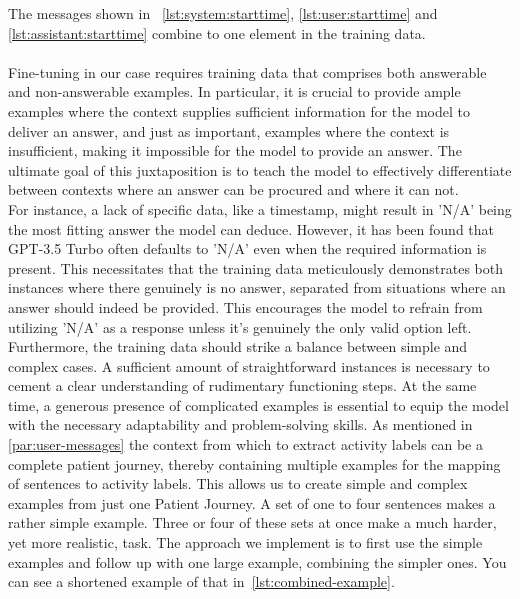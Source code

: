 The messages shown in ~\autoref{lst:system:starttime}, \ref{lst:user:starttime} and \ref{lst:assistant:starttime} combine to one element in the training data.\\\\

Fine-tuning in our case requires training data that comprises both answerable and non-answerable examples. In particular, it is crucial to provide ample examples where the context supplies sufficient information for the model to deliver an answer, and just as important, examples where the context is insufficient, making it impossible for the model to provide an answer. The ultimate goal of this juxtaposition is to teach the model to effectively differentiate between contexts where an answer can be procured and where it can not.\\
For instance, a lack of specific data, like a timestamp, might result in 'N/A' being the most fitting answer the model can deduce. However, it has been found that GPT-3.5 Turbo often defaults to 'N/A' even when the required information is present. This necessitates that the training data meticulously demonstrates both instances where there genuinely is no answer, separated from situations where an answer should indeed be provided. This encourages the model to refrain from utilizing 'N/A' as a response unless it’s genuinely the only valid option left.\\
Furthermore, the training data should strike a balance between simple and complex cases. A sufficient amount of straightforward instances is necessary to cement a clear understanding of rudimentary functioning steps. At the same time, a generous presence of complicated examples is essential to equip the model with the necessary adaptability and problem-solving skills. As mentioned in \ref{par:user-messages} the context from which to extract activity labels can be a complete patient journey, thereby containing multiple examples for the mapping of sentences to activity labels.  This allows us to create simple and complex examples from just one Patient Journey. A set of one to four sentences makes a rather simple example. Three or four of these sets at once make a much harder, yet more realistic, task. The approach we implement is to first use the simple examples and follow up with one large example, combining the simpler ones. You can see a shortened example of that in~\autoref{lst:combined-example}.
